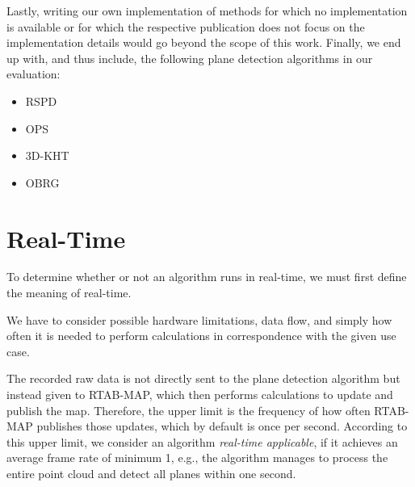 \documentclass[main.tex]{subfiles}
\begin{document}
Lastly, writing our own implementation of methods for which no implementation is available or for which the respective publication does not focus on the implementation details would go beyond the scope of this work.
Finally, we end up with, and thus include, the following plane detection algorithms in our evaluation:

\begin{itemize}
    \item RSPD
    \item OPS
    \item 3D-KHT
    \item OBRG
\end{itemize}


\section{Real-Time}
To determine whether or not an algorithm runs in real-time, we must first define the meaning of real-time.

We have to consider possible hardware limitations, data flow, and simply
how often it is needed to perform calculations in correspondence with the given use case.

The recorded raw data is not directly sent to the plane detection algorithm but instead given to RTAB-MAP, which then performs
calculations to update and publish the map.
Therefore, the upper limit is the frequency of how often RTAB-MAP publishes those updates, which by default is once per second.
According to this upper limit, we consider an algorithm \textit{real-time applicable}, if it achieves an average frame
rate of minimum 1, e.g., the algorithm manages to process the entire point cloud and detect all planes within one second.

\end{document}
